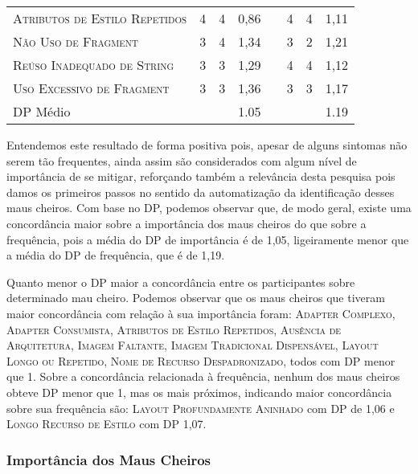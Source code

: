\begin{table}[!htb]
\begin{tabular}{@{}p{9cm}cccp{.5cm}ccc@{}}
\textsc{Atributos de Estilo Repetidos} & 4 & 4 & 0,86 & & 4 & 4 & 1,11 \\ 
\textsc{Não Uso de Fragment} & 3 & 4 & 1,34 & & 3 & 2 & 1,21 \\ 
\textsc{Reúso Inadequado de String} & 3 & 3 & 1,29 & & 4 & 4 & 1,12 \\ 
\textsc{Uso Excessivo de Fragment} & 3 & 3 & 1,36 & & 3 & 3 & 1,17 \\  
\toprule
DP Médio &  &  & 1.05 &  & &  & 1.19 \\ 
\bottomrule
\end{tabular}
\label{tab:SmellFrequencyImportance}
\end{table}


Entendemos este resultado de forma positiva pois, apesar de alguns sintomas não serem tão frequentes, ainda assim são considerados com algum nível de importância de se mitigar, reforçando também a relevância desta pesquisa pois damos os primeiros passos no sentido da automatização da identificação desses maus cheiros. Com base no DP, podemos observar que, de modo geral, existe uma concordância maior sobre a importância dos maus cheiros do que sobre a frequência, pois a média do DP de importância é de 1,05, ligeiramente menor que a média do DP de frequência, que é de 1,19. 

Quanto menor o DP maior a concordância entre os participantes sobre determinado mau cheiro. Podemos observar que os maus cheiros que tiveram maior concordância com relação à sua importância foram: \textsc{\small Adapter Complexo}, \textsc{\small Adapter Consumista}, \textsc{\small Atributos de Estilo Repetidos}, \textsc{\small Ausência de Arquitetura}, \textsc{\small Imagem Faltante}, \textsc{\small Imagem Tradicional Dispensável}, \textsc{\small Layout Longo ou Repetido}, \textsc{\small Nome de Recurso Despadronizado}, todos com DP menor que 1. Sobre a concordância relacionada à frequência, nenhum dos maus cheiros obteve DP menor que 1, mas os mais próximos, indicando maior concordância sobre sua frequência são: \textsc{\small Layout Profundamente Aninhado} com DP de 1,06 e \textsc{\small Longo Recurso de Estilo} com DP 1,07. 


\subsubsection{Importância dos Maus Cheiros}

